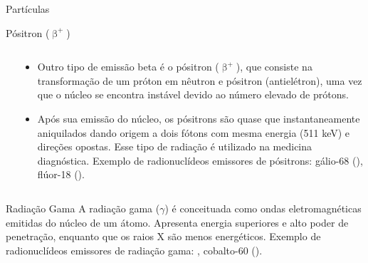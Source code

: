\documentclass[presentation]{beamer}
\begin{document}
\begin{frame}[label={sec:orgdc27edd}]{Partículas}
\begin{block}{Pósitron (\(\upbeta^+\))}
\begin{columns}
\begin{column}{0.45\columnwidth}
\end{column}


\begin{column}{0.45\columnwidth}
\begin{itemize}
\item Outro tipo de emissão beta é o pósitron (\(\upbeta ^+\)), que consiste na transformação de  um  próton  em  nêutron  e  pósitron  (antielétron),  uma  vez  que  o  núcleo  se  encontra  instável  devido  ao  número  elevado  de  prótons.
\item Após  sua  emissão  do  núcleo, os pósitrons são quase que instantaneamente aniquilados dando origem a dois fótons com mesma energia (511 keV) e direções opostas. Esse tipo de radiação é utilizado na medicina diagnóstica. Exemplo de radionuclídeos emissores de pósitrons: gálio-68  (), flúor-18 ().
\end{itemize}
\end{column}
\end{columns}
\end{block}


\begin{block}{Radiação Gama}
A radiação \alert{gama} (\(\gamma\)) é conceituada como ondas eletromagnéticas emitidas do núcleo de um átomo. Apresenta energia superiores e alto poder de penetração, enquanto que os raios X são menos energéticos. Exemplo de radionuclídeos emissores de radiação gama:  , cobalto-60 ().





\end{block}
\end{frame}
\end{document}
